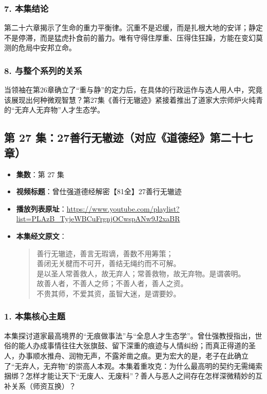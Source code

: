 \subsubsection{7. 本集结论}
第二十六章揭示了生命的重力平衡律。沉重不是迟缓，而是扎根大地的安详；静定不是停滞，而是猛虎扑食前的蓄力。唯有守得住厚重、压得住狂躁，方能在变幻莫测的危局中安邦立命。

\subsubsection{8. 与整个系列的关系}
当领袖在第26章确立了“重与静”的定力后，在具体的行政运作与选人用人中，究竟该展现出何种微观智慧？第27集《善行无辙迹》紧接着推出了道家大宗师炉火纯青的“无弃人无弃物”人才生态学。

\clearpage

\subsection{第 27 集：27善行无辙迹（对应《道德经》第二十七章）}
\label{sec:ep27}

\begin{itemize}
    \item \textbf{集数}：第 27 集
    \item \textbf{视频标题}：曾仕强道德经解密【81全】27善行无辙迹
    \item \textbf{播放列表原址}：\url{https://www.youtube.com/playlist?list=PLAzB_TyjeWBCuFrgnjOCwspANw9J2xaBR}
    \item \textbf{本集经文原文}：
    \begin{quote}\kaishu
    善行无辙迹，善言无瑕谪，善数不用筹策；\\
    善闭无关楗而不可开，善结无绳约而不可解。\\
    是以圣人常善救人，故无弃人；常善救物，故无弃物。是谓袭明。\\
    故善人者，不善人之师；不善人者，善人之资。\\
    不贵其师，不爱其资，虽智大迷，是谓要妙。
    \end{quote}
\end{itemize}

\subsubsection{1. 本集核心主题}
本集探讨道家最高境界的“无痕做事法”与“全息人才生态学”。曾仕强教授指出，世俗的能人办成事情往往大张旗鼓、留下深重的痕迹与人情纠纷；而真正得道的圣人，办事顺水推舟、润物无声，不露斧凿之痕。更为宏大的是，老子在此确立了“无弃人，无弃物”的崇高人本观。本集着重攻克：为什么最高明的契约无需绳索捆绑？怎样才能让天下“无废人、无废料”？善人与恶人之间存在怎样深微精妙的互补关系（师资互换）？

